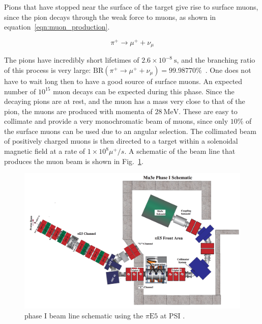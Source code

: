 Pions that have stopped near the surface of the target give rise to surface muons, since the pion decays through the weak force to muons, as shown in equation~\ref{eqn:muon_production}.

\begin{equation}
\label{eqn:muon_production}
\pi^+ \rightarrow \mu^+ + \nu_\mu
\end{equation}

\noindent The pions have incredibly short lifetimes of $2.6 \times 10^{-8}~\textrm{s}$, and the branching ratio of this process is very large: $\textrm{BR}(\pi^+ \rightarrow \mu^+ + \nu_\mu) = 99.98770\%$~\cite{Agashe:2014kda}.
One does not have to wait long then to have a good source of surface muons.
An expected number of $10^{15}$ muon decays can be expected during this phase.
Since the decaying pions are at rest, and the muon has a mass very close to that of the pion, the muons are produced with momenta of $28~\textrm{MeV}$.
These are easy to collimate and provide a very monochromatic beam of muons, since only $10\%$ of the surface muons can be used due to an angular selection.
The collimated beam of positively charged muons is then directed to a target within a solenoidal magnetic field at a rate of $1 \times 10^8 \mu^+/s$.
A schematic of the beam line that produces the muon beam is shown in Fig.~\ref{fig:mu3e_phaseI_schematic}.

\begin{figure}[h]
    \centering
    \includegraphics[width = \textwidth]{Figures/experiments/mu3e_phase1_schematic.png}
    \caption[\mueee phase I beam line schematic using the $\pi\textrm{E5}$ at PSI.]{\mueee phase I beam line schematic using the $\pi\textrm{E5}$ at PSI \cite{Blondel:2013ia}.}
    \label{fig:mu3e_phaseI_schematic}
\end{figure}

